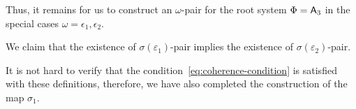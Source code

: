 Thus, it remains for us to construct an $\omega$-pair for the root system $\Phi=\mathsf{A}_3$ in the special cases $\omega = \epsilon_1, \epsilon_2$.

We claim that the existence of $\sigma(\varepsilon_1)$-pair implies the existence of $\sigma(\varepsilon_2)$-pair.


It is not hard to verify that the condition~\eqref{eq:coherence-condition} is satisfied with these definitions,
therefore, we have also completed the construction of the map $\sigma_1$.